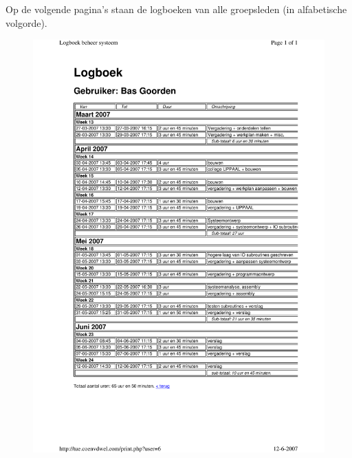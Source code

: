 Op de volgende pagina's staan de logboeken van alle groepsleden (in
alfabetische volgorde).

\begin{figure}
\begin{center}
\includegraphics[width=1\linewidth]{logboekbas}
\label{bas}
\end{center}
\end{figure}
